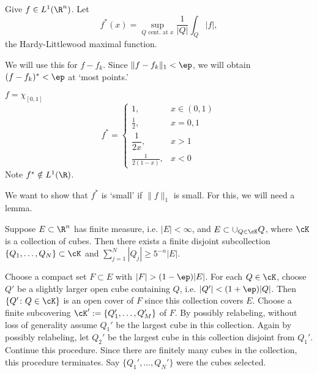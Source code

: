 \begin{dfn}
Give $f \in L^1(\R^n)$. Let 
	\[
	f^*(x)= \sup_{Q \text{ cent. at } x} \dfrac{1}{|Q|} \int_Q |f|,
	\]
the Hardy-Littlewood maximal function.
\end{dfn}


We will use this for $f - f_k$. Since $\| f - f_k \|_1 < \ep$, we will obtain $(f-f_k)^*<\ep$ at `most points.' 

\begin{ex}
$f= \chi_{[0,1]}$
	\[
	f^*= \begin{cases}
	1, & x \in (0,1) \\
	\frac{1}{2}, & x=0,1 \\
	\dfrac{1}{2x}, & x>1 \\
	\frac{1}{2(1-x)}, &  x<0
	\end{cases}
	\]
Note $f^* \notin L^1(\R)$.

\end{ex}















We want to show that $f^*$ is `small' if $\| f \|_1$ is small. For this, we will need a lemma.


\begin{lem}
Suppose $E \subset \R^n$ has finite measure, i.e. $|E|<\infty$, and $E \subset \cup_{Q \in \cK} Q$, where $\cK$ is a collection of cubes. Then there exists a finite disjoint subcollection $\{Q_1,\ldots,Q_N\} \subset \cK$ and $\sum_{j=1}^N |Q_j| \geq 5^{-n} |E|$. 
\end{lem}

\pf Choose a compact set $F \subset E$ with $|F| > (1-\ep) |E|$. For each $Q \in \cK$, choose $Q'$ be a slightly larger open cube containing $Q$, i.e. $|Q'| < (1+\ep) |Q|$. Then $\{ Q' \colon Q \in \cK \}$ is an open cover of $F$ since this collection covers $E$. Choose a finite subcovering $\cK':= \{Q_1',\ldots, Q_M' \}$ of $F$. By possibly relabeling, without loss of generality assume $Q_1'$ be the largest cube in this collection. Again by possibly relabeling, let $Q_2'$ be the largest cube in this collection disjoint from $Q_1'$. Continue this procedure. Since there are finitely many cubes in the collection, this procedure terminates. Say $\{Q_1', \ldots, Q_N' \}$ were the cubes selected. 


